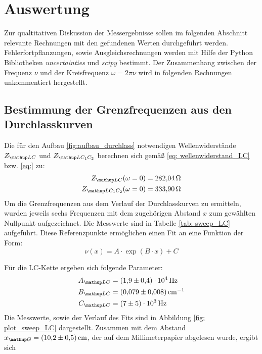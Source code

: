 \section{Auswertung}
Zur qualtitativen Diskussion der Messergebnisse sollen im folgenden Abschnitt relevante Rechnungen mit den gefundenen
Werten durchgeführt werden. Fehlerfortpflanzungen, sowie Ausgleichsrechnungen werden mit
Hilfe der Python Bibliotheken \emph{uncertainties}\cite{uncertainties} und \emph{scipy}\cite{scipy} bestimmt. Der Zusammenhang zwischen
der Frequenz $\nu$ und der Kreisfrequenz $\omega = 2\pi\nu$ wird in folgenden Rechnungen unkommentiert hergestellt.

\subsection{Bestimmung der Grenzfrequenzen aus den Durchlasskurven}
Die für den Aufbau \ref{fig:aufbau_durchlass} notwendigen Wellenwiderstände $Z\ua{LC}$ und $Z\ua{LC_1C_2}$ berechnen sich gemäß \eqref{eq: wellenwiderstand_LC} bzw. \eqref{eq:} zu:
\begin{align}
  Z\ua{LC}(\omega=0) &= \SI{282.04}{\ohm}\\
  Z\ua{LC_1C_2}(\omega=0) &= \SI{333.90}{\ohm}
  \label{eq: wellenwiderstand_zahlenwert}
\end{align}
Um die Grenzfrequenzen aus dem Verlauf der Durchlasskurven zu ermitteln, wurden jeweils sechs
Frequenzen mit dem zugehörigen Abstand $x$ zum gewählten Nullpunkt aufgezeichnet. Die Messwerte
sind in Tabelle \ref{tab: sweep_LC} aufgeführt. Diese Referenzpunkte ermöglichen einen Fit an eine Funktion der Form:
\begin{equation}
  \nu(x) = A \cdot \exp(B\cdot x) + C
  \label{eq: exp_fit}
\end{equation}
\FloatBarrier

Für die LC-Kette ergeben sich folgende Parameter:
\begin{align}
  \begin{aligned}
    A\ua{LC} &= \SI{1.9(4)e4}{\hertz}\\
    B\ua{LC} &= \SI{0.079(8)}{\cm^{-1}}\\
    C\ua{LC} &= \SI{7(5)e3}{\hertz}
  \end{aligned}
  \label{eq: params_LC}
\end{align}
Die Messwerte, sowie der Verlauf des Fits sind in Abbildung \ref{fig: plot_sweep_LC} dargestellt. Zusammen
mit dem Abstand $x\ua{G} = \SI{10.2(5)}{cm}$, der auf dem Millimeterpapier abgelesen wurde, ergibt sich
